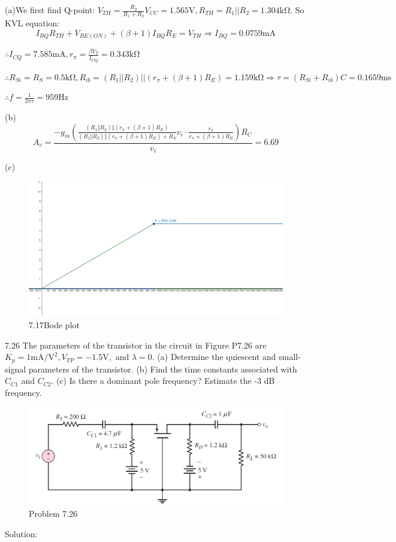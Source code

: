 \documentclass[a4paper,11pt,UTF8]{article}
\begin{document}
(a)We first find Q-point: $V_{TH}=\frac{R_2}{R_1+R_2}V_{CC}=1.565\mathrm{V},R_{TH}=R_1\left|\left|
\right.\right.R_2=1.304\mathrm{k\Omega}$. So KVL equation:
$$
	I_{BQ}R_{TH}+V_{BE(ON)}+(\beta+1)I_{BQ}R_E=V_{TH}\Rightarrow I_{BQ}=0.0759\mathrm{mA}
$$

$\displaystyle\therefore I_{CQ}=7.585\mathrm{mA},r_\pi=\frac{\beta V_T}{I_{CQ}}=0.343\mathrm{k\Omega}$

$\therefore R_{Si}=R_S=0.5\mathrm{k\Omega},R_{ib}=(R_{1}\left|\left|R_2\right.\right.)||(r_\pi+(\beta+1)R_E)=1.159\mathrm{k\Omega}\Rightarrow\tau=(R_{Si}+R_{ib})C=0.1659 \mathrm{ms}$

$\displaystyle\therefore f=\frac{1}{2\pi\tau}=959\mathrm{Hz}$

(b)
$$
	A_v=\frac{-g_m\left(\displaystyle\frac{(R_1\Vert R_2)\Vert (r_\pi+(\beta+1)R_E)}{(R_1\Vert R_2)\Vert (r_\pi+(\beta+1)R_E)+R_S}v_i\cdot \frac{r_\pi}{r_\pi+(\beta+1)R_E}\right)R_C}{v_i}=6.69
$$

(c)
\begin{figure}[H]
	\centering
	\includegraphics[scale=0.3]{MD7.17_1}
	\caption{7.17Bode plot}
\end{figure}
7.26 The parameters of the transistor in the circuit in Figure P7.26 are $K_p =1 \mathrm{mA/V^2}, V_{TP} = -1.5\mathrm{V},$ and $\lambda=0$. (a) Determine the quiescent and small-signal parameters of the transistor. (b) Find the time constants associated with $C_{C1}$ and $C_{C2}$. (c) Is there a dominant pole frequency? Estimate the -3 dB frequency.
\begin{figure}[H]
	\centering
	\includegraphics[scale=0.3]{MD7.26}
	\caption{Problem 7.26}
\end{figure}
Solution:
\end{document}
